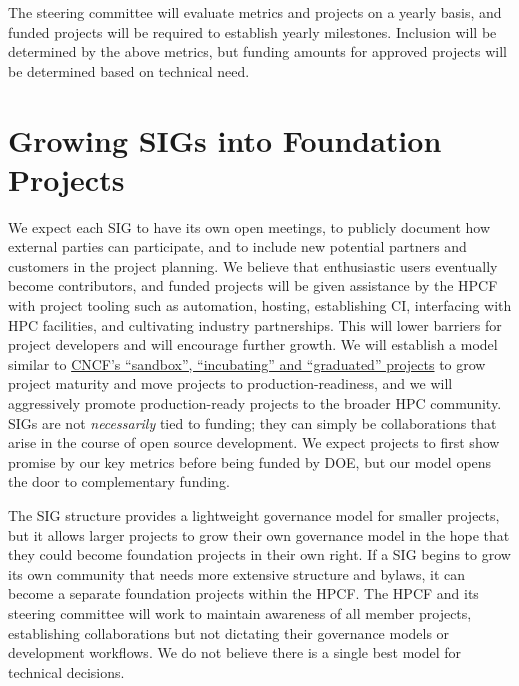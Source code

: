 \documentclass[11pt]{article}
\begin{document}
The steering committee will evaluate metrics and projects on a yearly basis, and funded
projects will be required to establish yearly milestones. 
Inclusion will be determined by the above metrics, but
funding amounts for approved projects will be determined based on technical need.

\section{Growing SIGs into Foundation Projects}

We expect each SIG to have its own open meetings, to publicly document how external
parties can participate, and to include new potential partners and customers in the
project planning. We believe that enthusiastic users eventually become contributors, and
funded projects will be given assistance by the HPCF with project tooling such as
automation, hosting, establishing CI, interfacing with HPC facilities, and cultivating
industry partnerships. This will lower barriers for project developers and will
encourage further growth. We will establish a model similar to
\href{https://www.cncf.io/projects/}{CNCF's ``sandbox'', ``incubating'' and
  ``graduated'' projects} to grow project maturity and move projects to
production-readiness, and we will aggressively promote production-ready projects to the
broader HPC community. SIGs are not {\it necessarily} tied to funding; they can simply
be collaborations that arise in the course of open source development. We expect
projects to first show promise by our key metrics before being funded by DOE, but our
model opens the door to complementary funding.

The SIG structure provides a lightweight governance model for smaller projects, but it
allows larger projects to grow their own governance model in the hope that they could
become foundation projects in their own right. If a SIG begins to grow its own community
that needs more extensive structure and bylaws, it can become a separate foundation
projects within the HPCF. The HPCF and its steering committee will work to maintain
awareness of all member projects, establishing collaborations but not dictating their
governance models or development workflows. We do not believe there is a single best
model for technical decisions.
\end{document}
